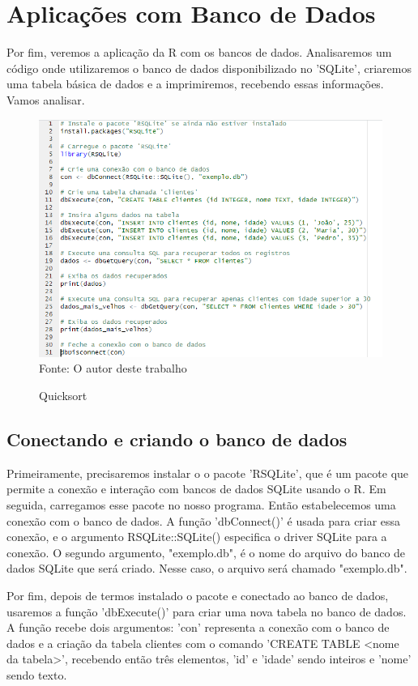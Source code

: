     \section{Aplica\c{c}\~{o}es com Banco de Dados}
    Por fim, veremos a aplicação da R com os bancos de dados. Analisaremos um código onde utilizaremos o banco de dados disponibilizado no 'SQLite', criaremos uma tabela básica de dados e a imprimiremos, recebendo essas informações. Vamos analisar.
    \begin{figure}[H]
    	\centering
    	\caption{Quicksort}
    	\includegraphics[width=1.0\linewidth]{Prints/screenshot025}
    	\label{fig:screenshot025}
    	{\tiny \sf Fonte: O autor deste trabalho }
    \end{figure}
    \subsection{Conectando e criando o banco de dados}
    Primeiramente, precisaremos instalar o o pacote 'RSQLite', que é um pacote que permite a conexão e interação com bancos de dados SQLite usando o R. Em seguida, carregamos esse pacote no nosso programa. Então estabelecemos uma conexão com o banco de dados. A função 'dbConnect()' é usada para criar essa conexão, e o argumento RSQLite::SQLite() especifica o driver SQLite para a conexão. O segundo argumento, "exemplo.db", é o nome do arquivo do banco de dados SQLite que será criado. Nesse caso, o arquivo será chamado "exemplo.db". \par Por fim, depois de termos instalado o pacote e conectado ao banco de dados, usaremos a função 'dbExecute()' para criar uma nova tabela no banco de dados. A função recebe dois argumentos: 'con' representa a conexão com o banco de dados e a criação da tabela clientes com o comando 'CREATE TABLE <nome da tabela>', recebendo então três elementos, 'id' e 'idade' sendo inteiros e 'nome' sendo texto.

